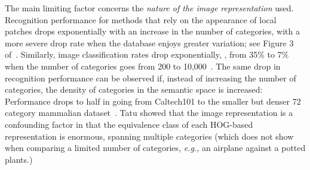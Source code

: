 The main limiting factor concerns 
the \textit{nature of the image representation} used. Recognition  performance for methods that
rely on the appearance of local patches drops exponentially with an increase in the number of categories, with a more severe drop rate
when the database enjoys greater variation; see Figure 3 of~\cite{Griffin:Perona:CVPR08}. Similarly, image classification rates drop exponentially, \eg, from 35\% to 7\% when the number of categories goes from 200 to 10,000~\cite{Deng:etal:ECCV10}.
The same drop in recognition performance can be observed if, instead of
increasing the number of categories, the density of categories in the semantic
space is increased: Performance drops to half in going from Caltech101 to the smaller but denser 72 category mammalian dataset~\cite{Fink:Ullman:IJCV08}.
Tatu \etal\cite{Tatu:Lauze:Kimia:ICCV11} showed that  the image representation is a confounding factor
in that the equivalence class of each HOG-based representation is enormous, spanning
multiple categories (which does not show when comparing a limited number
of categories, \textit{e.g.,} an airplane against
a potted plants.) 
